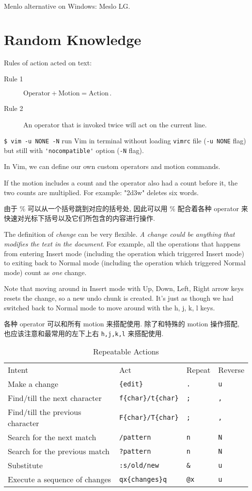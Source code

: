 Menlo alternative on Windows: Meslo LG. 
\part{Random Knowledge}
Rules of action acted on text:
\begin{description}
  \item[Rule 1] $\text{Operator} + \text{Motion} = \text{Action}\,.$
  \item[Rule 2] An operator that is invoked twice will act on the current line.
\end{description}

  \verb|$ vim -u NONE -N| run Vim in terminal without loading \verb|vimrc| file (\verb|-u NONE| flag) but still with \verb|'nocompatible'| option (\verb|-N| flag).

In Vim, we can define our own custom operators and motion commands.

If the motion includes a count and the operator also had a count before it, the two counts are multiplied. For example: "2d3w" deletes six words.

由于 \% 可以从一个括号跳到对应的括号处, 因此可以用 \% 配合着各种 operator 来快速对光标下括号以及它们所包含的内容进行操作.

The definition of \emph{change} can be very flexible. \emph{A change could be anything that modifies the text in the document}. For example, all the operations that happens from entering Insert mode (including the operation which triggered Insert mode) to exiting back to Normal mode (including the operation which triggered Normal mode) count as \emph{one} change.

Note that moving around in Insert mode with Up, Down, Left, Right arrow keys resets the change, so a new undo chunk is created. It's just as though we had switched back to Normal mode to move around with the h, j, k, l keys.

各种 operator 可以和所有 motion 来搭配使用. 除了和特殊的 motion 操作搭配, 也应该注意和最常用的左下上右 \verb|h,j,k,l| 来搭配使用.

\begin{table}
  \centering
 \begin{tabular}{llll}
  Intent&Act&Repeat&Reverse\\
  Make a change&\verb|{edit}|&\verb|.|&\verb|u|\\
  Find/till the next character&\verb|f{char}/t{char}|&\verb|;|&\verb|,|\\
  Find/till the previous character&\verb|F{char}/T{char}|&\verb|;|&\verb|,|\\
  Search for the next match&\verb|/pattern|&\verb|n|&\verb|N|\\
  Search for the previous match&\verb|?pattern|&\verb|n|&\verb|N|\\
  Substitute&\verb|:s/old/new|&\verb|&|&\verb|u|\\
  Execute a sequence of changes&\verb|qx{changes}q|&\verb|@x|&\verb|u|
\end{tabular}
  \caption{Repeatable Actions}
  \label{tab:RepeatableActions}
\end{table}

